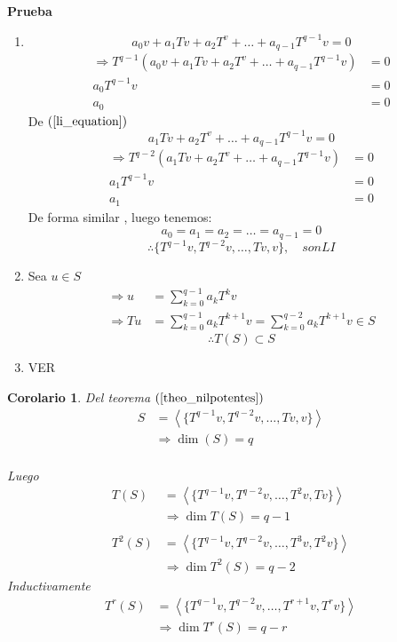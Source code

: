 \documentclass[10pt,a4paper]{article}
\newtheorem{mycorol}{Corolario}
\begin{document}
\textbf{Prueba}
\begin{enumerate}
	\item \begin{equation}\label{li_equation}
		a_{0}v + a_{1}Tv + a_{2}T^{v} + \ldots + a_{q-1}T^{q-1}v = 0
	\end{equation}
	\begin{align*}
		\Rightarrow T^{q-1}\left(a_{0}v + a_{1}Tv + a_{2}T^{v} + \ldots + a_{q-1}T^{q-1}v\right) & = 0\\
		a_{0}T^{q-1}v &= 0\\
		a_{0} &= 0
	\end{align*}
	De $(\ref{li_equation})$
	$$a_{1}Tv + a_{2}T^{v} + \ldots + a_{q-1}T^{q-1}v = 0$$
	\begin{align*}
		\Rightarrow T^{q-2}\left(a_{1}Tv + a_{2}T^{v} + \ldots + a_{q-1}T^{q-1}v\right) & = 0\\
		a_{1}T^{q-1}v &= 0\\
		a_{1} &= 0
	\end{align*}
	De forma similar , luego tenemos:
		$$a_{0} = a_{1} = a_{2} = \ldots = a_{q-1} = 0$$
		$$\therefore \{T^{q-1}v, T^{q-2}v,\ldots,Tv, v\},\quad son LI$$
	\item Sea $ u\in S$
		\begin{align*}
			\Rightarrow u &= \sum_{k=0}^{q-1}a_{k}T^{k}v\\
			\Rightarrow Tu &=  \sum_{k=0}^{q-1}a_{k}T^{k+1}v = \sum_{k=0}^{q-2}a_{k}T^{k+1}v\in S
		\end{align*}
		$$\therefore T(S)\subset S$$
	\item VER
\end{enumerate}

\begin{mycorol}
	Del teorema $(\ref{theo_nilpotentes})$
	\begin{align*}
		S &= \left<\{T^{q-1}v, T^{q-2}v,\ldots,Tv, v\}\right>\\
		&\Rightarrow\dim (S) = q\\			
	\end{align*}

	Luego 
	\begin{align*}
		T(S) &= \left<\{T^{q-1}v, T^{q-2}v,\ldots,T^{2}v, Tv\}\right>\\
		&\Rightarrow\dim T(S) = q-1\\\\
		T^{2}(S) &= \left<\{T^{q-1}v, T^{q-2}v,\ldots,T^{3}v, T^{2}v\}\right>\\
		&\Rightarrow\dim T^{2}(S) = q-2
	\end{align*}
	Inductivamente 
	\begin{align*}
		T^{r}(S) &= \left<\{T^{q-1}v, T^{q-2}v,\ldots,T^{r+1}v, T^{r}v\}\right>\\
		&\Rightarrow\dim T^{r}(S) = q-r\\			
	\end{align*}
\end{mycorol}
\end{document}
